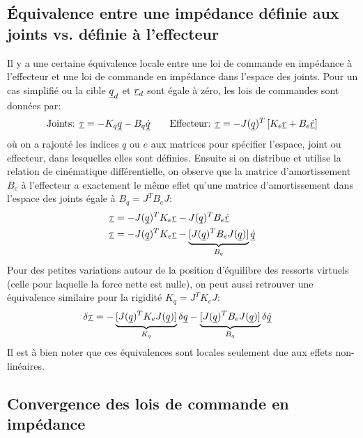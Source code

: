 \subsection{Équivalence entre une impédance définie aux joints vs. définie à l'effecteur}

Il y a une certaine équivalence locale entre une loi de commande en impédance à l'effecteur et une loi de commande en impédance dans l'espace des joints. Pour un cas simplifié ou la cible $\underline{q}_d$ et $\underline{r}_d$ sont égale à zéro, les lois de commandes sont données par: 
\begin{align}
\text{Joints: }
\underline{\tau} = - K_q \underline{q} - B_q \underline{\dot{q}}
\quad\quad
\text{Effecteur: }
\underline{\tau} = - J(\underline{q})^T   \left[ K_e \underline{r} + B_e \underline{\dot{r}} \right] 
\end{align}
où on a rajouté les indices $q$ ou $e$ aux matrices pour spécifier l'espace, joint ou effecteur, dans lesquelles elles sont définies. Ensuite si on distribue et utilise la relation de cinématique différentielle, on observe que la matrice d'amortissement $B_e$ à l'effecteur a exactement le même effet qu'une matrice d'amortissement dans l'espace des joints égale à $B_q = J^T B_e J$:
\begin{align}
\underline{\tau} &= - J(\underline{q})^T   K_e \underline{r} - J(\underline{q})^T B_e \underline{\dot{r}} \\
\underline{\tau} &= - J(\underline{q})^T   K_e \underline{r} - \underbrace{ [ J(\underline{q})^T   B_e  J(\underline{q}) ] }_{ B_q } \underline{\dot{q}}
\end{align}
Pour des petites variations autour de la position d'équilibre des ressorts virtuels (celle pour laquelle la force nette est nulle), on peut aussi retrouver une équivalence similaire pour la rigidité $K_q = J^T K_e J$:
\begin{align}
\delta \underline{\tau} &= - \underbrace{ [ J(\underline{q})^T   K_e  J(\underline{q}) ] }_{ K_q }
\delta \underline{q} - \underbrace{ [ J(\underline{q})^T   B_e  J(\underline{q}) ] }_{ B_q }\delta \underline{\dot{q}}
\end{align}
Il est à bien noter que ces équivalences sont locales seulement due aux effets non-linéaires. 

\subsection{Convergence des lois de commande en impédance}
\label{sec:impcontrolconvergence}

